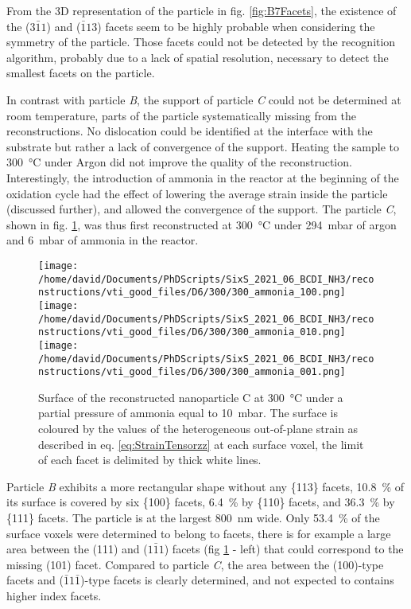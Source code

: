From the 3D representation of the particle in fig. \ref{fig:B7Facets}, the existence of the ($3\bar{1}1$) and ($\bar{1}13$) facets seem to be highly probable when considering the symmetry of the particle.
Those facets could not be detected by the recognition algorithm, probably due to a lack of spatial resolution, necessary to detect the smallest facets on the particle.

In contrast with particle \textit{B}, the support of particle \textit{C} could not be determined at room temperature, parts of the particle systematically missing from the reconstructions.
No dislocation could be identified at the interface with the substrate but rather a lack of convergence of the support.
Heating the sample to \qty{300}{\degreeCelsius} under Argon did not improve the quality of the reconstruction.
Interestingly, the introduction of ammonia in the reactor at the beginning of the oxidation cycle had the effect of lowering the average strain inside the particle (discussed further), and allowed the convergence of the support.
The particle \textit{C}, shown in fig. \ref{fig:D6Facets}, was thus first reconstructed at \qty{300}{\degreeCelsius} under \qty{294}{\milli\bar} of argon and \qty{6}{\milli\bar} of ammonia in the reactor.

\begin{figure}[!htb]
    \centering
    \texttt{[image: /home/david/Documents/PhDScripts/SixS\_2021\_06\_BCDI\_NH3/reconstructions/vti\_good\_files/D6/300/300\_ammonia\_100.png]}
    \texttt{[image: /home/david/Documents/PhDScripts/SixS\_2021\_06\_BCDI\_NH3/reconstructions/vti\_good\_files/D6/300/300\_ammonia\_010.png]}
    \texttt{[image: /home/david/Documents/PhDScripts/SixS\_2021\_06\_BCDI\_NH3/reconstructions/vti\_good\_files/D6/300/300\_ammonia\_001.png]}
    \caption{
        Surface of the reconstructed nanoparticle C at \qty{300}{\degreeCelsius} under a partial pressure of ammonia equal to \qty{10}{\milli\bar}.
        The surface is coloured by the values of the heterogeneous out-of-plane strain as described in eq. \ref{eq:StrainTensorzz} at each surface voxel, the limit of each facet is delimited by thick white lines.
    }
    \label{fig:D6Facets}
\end{figure}

Particle \textit{B} exhibits a more rectangular shape without any \{113\} facets, \qty{10.8}{\percent} of its surface is covered by six \{100\} facets, \qty{6.4}{\percent} by \{110\} facets, and \qty{36.3}{\percent} by \{111\} facets.
The particle is at the largest \qty{800}{\nm} wide.
Only \qty{53.4}{\percent} of the surface voxels were determined to belong to facets, there is for example a large area between the (111) and ($1\bar{1}1$) facets (fig \ref{fig:D6Facets} - left) that could correspond to the missing (101) facet.
Compared to particle \textit{C}, the area between the (100)-type facets and ($\bar{1}1\bar{1}$)-type facets is clearly determined, and not expected to contains higher index facets.

